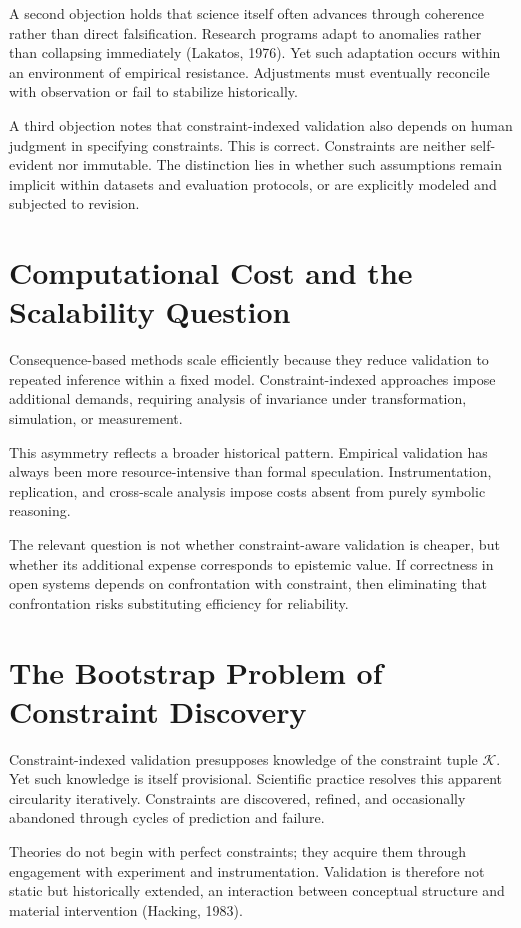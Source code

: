 \documentclass[12pt]{article}
\begin{document}
A second objection holds that science itself often advances through coherence rather than direct falsification. Research programs adapt to anomalies rather than collapsing immediately (Lakatos, 1976). Yet such adaptation occurs within an environment of empirical resistance. Adjustments must eventually reconcile with observation or fail to stabilize historically.

A third objection notes that constraint-indexed validation also depends on human judgment in specifying constraints. This is correct. Constraints are neither self-evident nor immutable. The distinction lies in whether such assumptions remain implicit within datasets and evaluation protocols, or are explicitly modeled and subjected to revision.

\section{Computational Cost and the Scalability Question}

Consequence-based methods scale efficiently because they reduce validation to repeated inference within a fixed model. Constraint-indexed approaches impose additional demands, requiring analysis of invariance under transformation, simulation, or measurement.

This asymmetry reflects a broader historical pattern. Empirical validation has always been more resource-intensive than formal speculation. Instrumentation, replication, and cross-scale analysis impose costs absent from purely symbolic reasoning.

The relevant question is not whether constraint-aware validation is cheaper, but whether its additional expense corresponds to epistemic value. If correctness in open systems depends on confrontation with constraint, then eliminating that confrontation risks substituting efficiency for reliability.

\section{The Bootstrap Problem of Constraint Discovery}

Constraint-indexed validation presupposes knowledge of the constraint tuple \(\mathcal{K}\). Yet such knowledge is itself provisional. Scientific practice resolves this apparent circularity iteratively. Constraints are discovered, refined, and occasionally abandoned through cycles of prediction and failure.

Theories do not begin with perfect constraints; they acquire them through engagement with experiment and instrumentation. Validation is therefore not static but historically extended, an interaction between conceptual structure and material intervention (Hacking, 1983).
\end{document}
